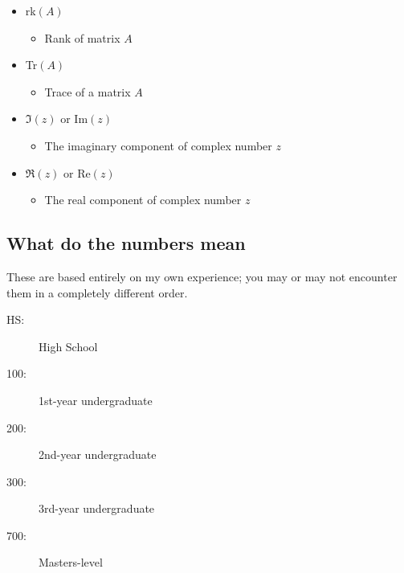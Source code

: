 \begin{itemize}
\item rk$(A)$
\begin{itemize}
\item Rank of matrix $A$
\end{itemize}

\item Tr$(A)$
\begin{itemize}
\item Trace of a matrix $A$
\end{itemize}

\item $\Im(z)$ or Im$(z)$
\begin{itemize}
\item The imaginary component of complex number $z$
\end{itemize}

\item $\Re(z)$ or Re$(z)$
\begin{itemize}
\item The real component of complex number $z$
\end{itemize}				
\end{itemize}

\subsection{What do the numbers mean}

These are based entirely on my own experience; you may or may not encounter them in a completely different order.

\begin{description}
\item[HS:] High School
\item[100:] 1st-year undergraduate
\item[200:] 2nd-year undergraduate
\item[300:] 3rd-year undergraduate
\item[700:] Masters-level
\end{description}
	